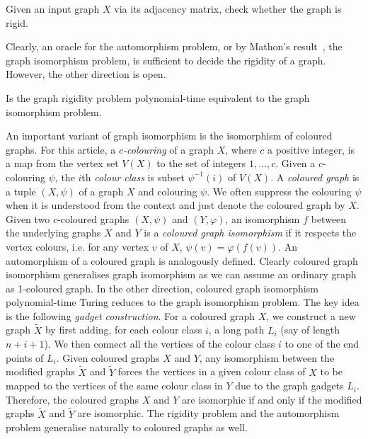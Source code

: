 \documentclass{article}
\begin{document}
\begin{problem}
  Given an input graph $X$ via its adjacency matrix, check whether the
  graph is rigid.
\end{problem}

Clearly, an oracle for the automorphism problem, or by Mathon's
result~\cite{mathon79note}, the graph isomorphism problem, is
sufficient to decide the rigidity of a graph. However, the other
direction is open.

\begin{openproblem}
  Is the graph rigidity problem polynomial-time equivalent to the
  graph isomorphism problem.
\end{openproblem}


An important variant of graph isomorphism is the isomorphism of
coloured graphs.  For this article, a \emph{$c$-colouring} of a graph
$X$, where $c$ a positive integer, is a map from the vertex set $V(X)$
to the set of integers ${1,\ldots,c}$. Given a $c$-colouring $\psi$,
the $i$th \emph{colour class} is subset $\psi^{-1}(i)$ of $V(X)$. A
\emph{coloured graph} is a tuple $(X,\psi)$ of a graph $X$ and
colouring $\psi$. We often suppress the colouring $\psi$ when it is
understood from the context and just denote the coloured graph by
$X$. Given two $c$-coloured graphs $(X,\psi)$ and $(Y, \varphi)$, an
isomorphism $f$ between the underlying graphs $X$ and $Y$ is a
\emph{coloured graph isomorphism} if it respects the vertex colours,
i.e. for any vertex $v$ of $X$, $\psi(v)= \varphi(f(v))$. An
automorphism of a coloured graph is analogously defined. Clearly
coloured graph isomorphism generalises graph isomorphism as we can
assume an ordinary graph as 1-coloured graph. In the other direction,
coloured graph isomorphism polynomial-time Turing reduces to the graph
isomorphism problem. The key idea is the following \emph{gadget
  construction}. For a coloured graph $X$, we construct a new graph
$\tilde{X}$ by first adding, for each colour class $i$, a long path
$L_i$ (say of length $n + i + 1$). We then connect all the vertices of
the colour class $i$ to one of the end points of $L_i$. Given coloured
graphs $X$ and $Y$, any isomorphism between the modified graphs
$\tilde{X}$ and $\tilde{Y}$ forces the vertices in a given colour
class of $X$ to be mapped to the vertices of the same colour class in
$Y$ due to the graph gadgets $L_i$. Therefore, the coloured graphs $X$
and $Y$ are isomorphic if and only if the modified graphs $\tilde{X}$
and $\tilde{Y}$ are isomorphic. The rigidity problem and the
automorphism problem generalise naturally to coloured graphs as well.
\end{document}
